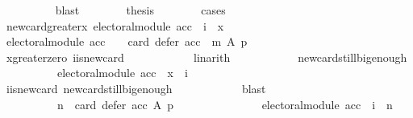 \begin{isabellebody}
\ \ \ \ \ \ \ \ \isamarkupfalse%
\ blast\isanewline
\ \ \ \ \ \ \isamarkupfalse%
\ {\isacharquery}{\kern0pt}thesis\isanewline
\ \ \ \ \ \ \isamarkupfalse%
\ cases\isanewline
\ \ \ \ \ \ \ \ \isamarkupfalse%
\ new{\isacharunderscore}{\kern0pt}card{\isacharunderscore}{\kern0pt}greater{\isacharunderscore}{\kern0pt}x{\isacharcolon}{\kern0pt}\ {\isachardoublequoteopen}electoral{\isacharunderscore}{\kern0pt}module\ acc\ {\isasymlongrightarrow}\ i\ {\isachargreater}{\kern0pt}\ x{\isachardoublequoteclose}\isanewline
\ \ \ \ \ \ \ \ \isamarkupfalse%
\ {\isachardoublequoteopen}electoral{\isacharunderscore}{\kern0pt}module\ acc\ {\isasymlongrightarrow}\ {}\ {\isacharless}{\kern0pt}\ card\ {\isacharparenleft}{\kern0pt}defer\ {\isacharparenleft}{\kern0pt}acc\ {\isasymtriangleright}\ m{\isacharparenright}{\kern0pt}\ A\ p{\isacharparenright}{\kern0pt}{\isachardoublequoteclose}\isanewline
\ \ \ \ \ \ \ \ \ \ \isamarkupfalse%
\ x{\isacharunderscore}{\kern0pt}greater{\isacharunderscore}{\kern0pt}zero\ i{\isacharunderscore}{\kern0pt}is{\isacharunderscore}{\kern0pt}new{\isacharunderscore}{\kern0pt}card\isanewline
\ \ \ \ \ \ \ \ \ \ \isamarkupfalse%
\ linarith\isanewline
\ \ \ \ \ \ \ \ \isamarkupfalse%
\ \isamarkupfalse%
\ new{\isacharunderscore}{\kern0pt}card{\isacharunderscore}{\kern0pt}still{\isacharunderscore}{\kern0pt}big{\isacharunderscore}{\kern0pt}enough{}{\isacharcolon}{\kern0pt}\isanewline
\ \ \ \ \ \ \ \ \ \ {\isachardoublequoteopen}electoral{\isacharunderscore}{\kern0pt}module\ acc\ {\isasymlongrightarrow}\ x\ {\isasymle}\ i{\isachardoublequoteclose}\ \isanewline
\ \ \ \ \ \ \ \ \ \ \isamarkupfalse%
\ i{\isacharunderscore}{\kern0pt}is{\isacharunderscore}{\kern0pt}new{\isacharunderscore}{\kern0pt}card\ new{\isacharunderscore}{\kern0pt}card{\isacharunderscore}{\kern0pt}still{\isacharunderscore}{\kern0pt}big{\isacharunderscore}{\kern0pt}enough\isanewline
\ \ \ \ \ \ \ \ \ \ \isamarkupfalse%
\ blast\isanewline
\ \ \ \ \ \ \ \ \isamarkupfalse%
\ \isamarkupfalse%
\isanewline
\ \ \ \ \ \ \ \ \ \ {\isachardoublequoteopen}n\ {\isacharequal}{\kern0pt}\ card\ {\isacharparenleft}{\kern0pt}defer\ acc\ A\ p{\isacharparenright}{\kern0pt}\ {\isasymlongrightarrow}\isanewline
\ \ \ \ \ \ \ \ \ \ \ \ \ \ {\isacharparenleft}{\kern0pt}electoral{\isacharunderscore}{\kern0pt}module\ acc\ {\isasymlongrightarrow}\ i\ {\isacharless}{\kern0pt}\ n{\isacharparenright}{\kern0pt}{\isachardoublequoteclose}\ \isanewline

\end{isabellebody}
